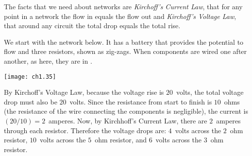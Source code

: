 The facts that we need about networks are  
\textit{Kirchoff's Current Law}, that for any point in a network the flow in
     equals the flow out and
\textit{Kirchoff's Voltage Law}, that around any circuit the total drop equals 
     the total rise.

We start with the network below.
It has a battery that provides the potential to flow 
and three resistors, shown as zig-zags.
When components are wired one after another, as here,
they are in .
\begin{center}
  \texttt{[image: ch1.35]}
\end{center}
By Kirchoff's Voltage Law, because the voltage rise is
$20$~volts, the total voltage drop must also be $20$~volts.
Since the resistance from start to finish is
$10$~ohms (the resistance of the wire connecting the components is negligible),
the current is $(20/10)=2$~amperes. 
Now, by Kirchhoff's Current Law, there are $2$~amperes through
each resistor.
Therefore the voltage drops are: 
$4$~volts across the $2$~ohm resistor,
$10$~volts across the $5$~ohm resistor, 
and $6$~volts across the $3$~ohm resistor.

